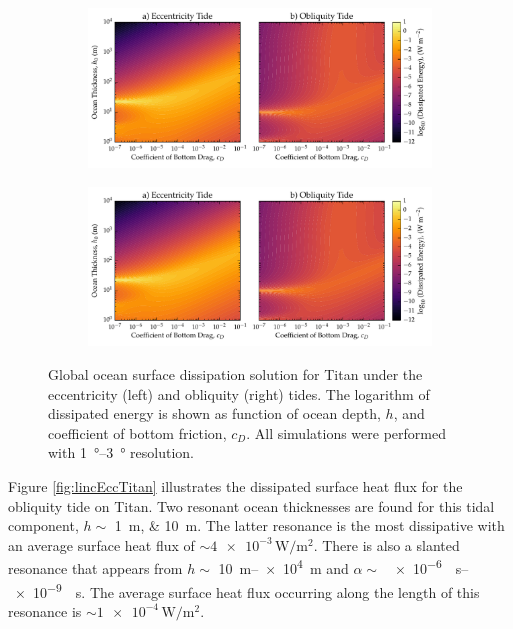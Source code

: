 \begin{figure}[!t]
    \centering
    \begin{subfigure}[t]{0.9\linewidth} %
        \includegraphics[width=\linewidth]{Figures/titan_bottom}
        \label{fig:botEccTitan}
    \end{subfigure}
    \begin{subfigure}[t]{0\linewidth} %
         \includegraphics[width=\linewidth]{Figures/titan_bottom}
         \label{fig:botObliqTitan}   
    \end{subfigure}
    \vspace{-0.5cm}
\caption{Global ocean surface dissipation solution for Titan under the eccentricity (left) and obliquity (right) tides. The logarithm of dissipated energy is shown as function of ocean depth, $h$, and coefficient of bottom friction, $c_D$. All simulations were performed with \SIrange{1}{3}{\degree} resolution. \label{fig:botTitan}}
\end{figure}

Figure \ref{fig:lincEccTitan} illustrates the dissipated surface heat flux for the obliquity tide on Titan. Two resonant ocean thicknesses are found for this tidal component, $h \sim$ \SIlist{1;10}{\metre}. The latter resonance is the most dissipative with an average surface heat flux of $\sim \num{4e-3}\, \si{\watt\per\square\metre}$. There is also a slanted resonance that appears from $h \sim$ \SIrange{10}{e4}{\metre} and \hbox{$\alpha \sim$ \SIrange{e-6}{e-9}{\per\second}}. The average surface heat flux occurring along the length of this resonance is $\sim \num{1e-4}\, \si{\watt\per\square\metre}$. 


